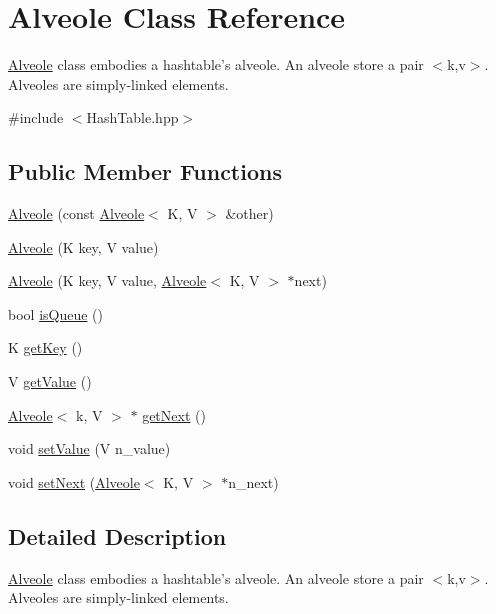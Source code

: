 \hypertarget{class_alveole}{\section{\-Alveole \-Class \-Reference}
\label{class_alveole}
}


\hyperlink{class_alveole}{\-Alveole} class embodies a hashtable's alveole. \-An alveole store a pair $<$k,v$>$. \-Alveoles are simply-\/linked elements.  




{\ttfamily \#include $<$\-Hash\-Table.\-hpp$>$}

\subsection*{\-Public \-Member \-Functions}
\begin{DoxyCompactItemize}
\item 
\hyperlink{class_alveole_a3ebfa3f42acae6ad928e8168114b3965}{\-Alveole} (const \hyperlink{class_alveole}{\-Alveole}$<$ \-K, \-V $>$ \&other)
\item 
\hyperlink{class_alveole_a1111a5bb957324fed31f9ac0aa2cc4a4}{\-Alveole} (\-K key, \-V value)
\item 
\hyperlink{class_alveole_a16053e1f59dc5a0f79b62d1872540b68}{\-Alveole} (\-K key, \-V value, \hyperlink{class_alveole}{\-Alveole}$<$ \-K, \-V $>$ $\ast$next)
\item 
bool \hyperlink{class_alveole_a50d6115afd8f29ed898e210b51e901e5}{is\-Queue} ()
\item 
\-K \hyperlink{class_alveole_a851fe0cac8f81cae711385f10973cf5d}{get\-Key} ()
\item 
\-V \hyperlink{class_alveole_a0c56d83c6f8152a7674cddf1faf56bc5}{get\-Value} ()
\item 
\hyperlink{class_alveole}{\-Alveole}$<$ k, \-V $>$ $\ast$ \hyperlink{class_alveole_a9cd37fb49770eddbaa03519232b3f115}{get\-Next} ()
\item 
void \hyperlink{class_alveole_afd3607532906bead78ba7c52f956e0b0}{set\-Value} (\-V n\-\_\-value)
\item 
void \hyperlink{class_alveole_a3a542f1a81462e77d31b90e59f9f8287}{set\-Next} (\hyperlink{class_alveole}{\-Alveole}$<$ \-K, \-V $>$ $\ast$n\-\_\-next)
\end{DoxyCompactItemize}


\subsection{\-Detailed \-Description}
\hyperlink{class_alveole}{\-Alveole} class embodies a hashtable's alveole. \-An alveole store a pair $<$k,v$>$. \-Alveoles are simply-\/linked elements. 

